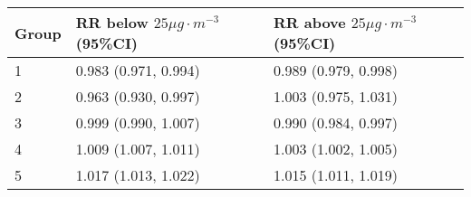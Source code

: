 \begin{tabular}{lll}
  \hline
Group & RR below $25 \mu g \cdot m^{-3}$ (95\%CI) & RR above $25 \mu g \cdot m^{-3}$ (95\%CI) \\ 
  \hline
   1 & 0.983 (0.971, 0.994) & 0.989 (0.979, 0.998) \\ 
     2 & 0.963 (0.930, 0.997) & 1.003 (0.975, 1.031) \\ 
     3 & 0.999 (0.990, 1.007) & 0.990 (0.984, 0.997) \\ 
     4 & 1.009 (1.007, 1.011) & 1.003 (1.002, 1.005) \\ 
     5 & 1.017 (1.013, 1.022) & 1.015 (1.011, 1.019) \\ 
   \hline
\end{tabular}

